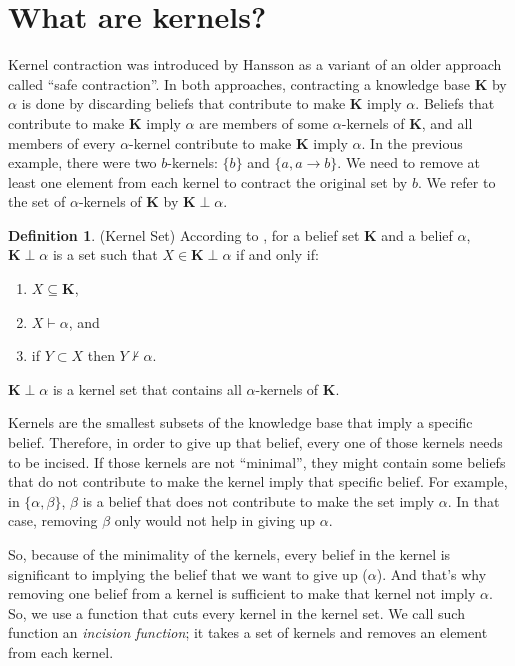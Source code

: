 \documentclass{sfuthesis}
\theoremstyle{plain}
\theoremstyle{definition}
\newtheorem{defn}[thm]{Definition}
\begin{document}
\section{What are kernels?}
Kernel contraction was introduced by Hansson\cite{kernel} as a variant of an older approach called ``safe contraction''\cite{safe}. In both approaches, contracting a knowledge base \textbf{K} by $\alpha$ is done by discarding beliefs that contribute to make \textbf{K} imply $\alpha$. Beliefs that contribute to make \textbf{K} imply $\alpha$ are members of some $\alpha$-kernels of \textbf{K}, and all members of every $\alpha$-kernel contribute to make \textbf{K} imply $\alpha$. In the previous example, there were two $b$-kernels: $\lbrace b \rbrace$ and $\lbrace a, a \rightarrow b \rbrace$. We need to remove at least one element from each kernel to contract the original set by $b$. We refer to the set of $\alpha$-kernels of \textbf{K} by $\textbf{K} \perp \alpha$.
\begin{defn}(Kernel Set)
According to \cite{hansson}, for a belief set \textbf{K} and a belief $\alpha$, $\textbf{K} \perp \alpha$ is a set such that $X \in \textbf{K} \perp \alpha$ if and only if:
\begin{enumerate}
\item $X \subseteq \textbf{K}$,
\item $X \vdash \alpha$, and
\item if $Y \subset X$ then $Y \nvdash \alpha$.
\end{enumerate}
$\textbf{K} \perp \alpha$ is a kernel set that contains all $\alpha$-kernels of \textbf{K}.
\end{defn}
Kernels are the smallest subsets of the knowledge base that imply a specific belief. Therefore, in order to give up that belief, every one of those kernels needs to be incised. If those kernels are not ``minimal'', they might contain some beliefs that do not contribute to make the kernel imply that specific belief. For example, in $\lbrace \alpha, \beta \rbrace$, $\beta$ is a belief that does not contribute to make the set imply $\alpha$. In that case, removing $\beta$ only would not help in giving up $\alpha$. 

So, because of the minimality of the kernels, every belief in the kernel is significant to implying the belief that we want to give up ($\alpha$). And that's why removing one belief from a kernel is sufficient to make that kernel not imply $\alpha$. So, we use a function that cuts every kernel in the kernel set. We call such function an \textit{incision function}; it takes a set of kernels and removes an element from each kernel. 
\end{document}
